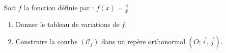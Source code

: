 \begin{Application}
Soit $f$ la fonction définie par : $f(x) = \frac{3}{x}$

\begin{enumerate}
    \item Donner le tableau de variations de $f$.
    \item Construire la courbe $(\mathcal{C}_f)$ dans un repère orthonormal $(O; \vec{i}, \vec{j})$.
\end{enumerate}
\end{Application}
